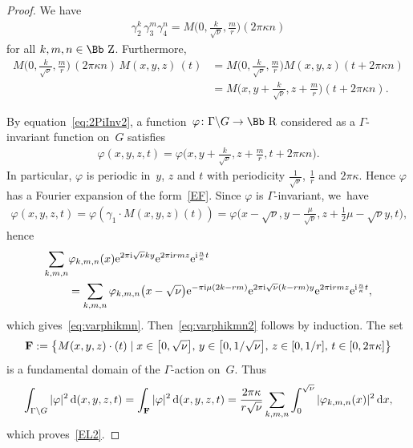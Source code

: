 \documentclass[pdftex]{sigma}
\newcommand\RR{{\mbox{\Bb R}}}
\newcommand\ZZ{{\mbox{\Bb Z}}}
\newcommand\bF{\textbf{{\rm \textbf{F}}}}
\newcommand\ph{\varphi}
\numberwithin{equation}{section}
\begin{document}
\begin{proof}
We have
\begin{gather*}
\gamma_2^{k} \,\gamma_3^{m}\gamma_4^{n} =M\bigg(0,\frac{k}{\sqrt\nu},\frac{m}{r}\bigg)(2\pi \kappa n)
\end{gather*}
for all $k,m,n\in\ZZ$.
Furthermore,
\begin{align}
M\bigg(0,\frac{k}{\sqrt\nu},\frac{m}{r}\bigg)\,(2\pi \kappa n)\, M(x,y,z)\,(t)
&=M\bigg(0,\frac{k}{\sqrt\nu},\frac{m}{r}\bigg)M(x,y,z)(t+2\pi\kappa n)\nonumber
\\
&=M\bigg(x,y+\frac{k}{\sqrt\nu},z+\frac{m}{r}\bigg)(t+2\pi \kappa n)\label{eq:2PiInv2}.
\end{align}

By equation~\eqref{eq:2PiInv2}, a function~$\varphi\colon \Gamma\backslash G\rightarrow\RR$ considered as a $\Gamma$-invariant function on~$G$ satisfies
\begin{gather*}
\varphi(x,y,z,t)=\varphi\bigg(x,y+\frac{k}{\sqrt\nu},z+\frac{m}r,t+2\pi \kappa n\bigg).
\end{gather*}
In particular, $\varphi$ is periodic in~$y$, $z$ and $t$ with periodicity $\frac{1}{\sqrt\nu}$, $\frac{1}{r}$ and $2\pi\kappa$.
Hence $\varphi$ has a Fourier expansion of the form~\eqref{EF}.
Since $\varphi$ is $\Gamma$-invariant, we~have
\begin{gather*}
\ph(x,y,z,t)=\ph(\gamma_1\cdot M(x,y,z)(t))=\ph\bigg(x-\sqrt\nu,y-\frac\mu{\sqrt\nu}, z+\frac12\mu-\sqrt\nu y,t\bigg),
\end{gather*}
hence
\begin{align*}
\sum_{k,m,n}&\varphi_{k,m,n}(x){\rm e}^{2\pi {\rm i}\sqrt\nu ky}{\rm e}^{2\pi {\rm i}rmz}{\rm e}^{{\rm i} \frac n \kappa t}\\
&=\sum_{k,m,n}\varphi_{k,m,n}\big(x-\sqrt\nu\big){\rm e}^{-\pi {\rm i}\mu (2k-rm)}{\rm e}^{2\pi {\rm i}\sqrt\nu (k-rm)y} {\rm e}^{2\pi {\rm i}rmz} {\rm e}^{{\rm i} \frac n\kappa t},
\end{align*}
which gives~\eqref{eq:varphikmn}. Then~\eqref{eq:varphikmn2} follows by induction.
The set
\begin{gather*}
\bF:=\big\{M(x,y,z)\cdot(t) \mid x\in \big[0,\sqrt\nu\big],\, y\in\big[0,1/\sqrt\nu\big],\, z\in[0,1/r],\, t\in[0,2\pi\kappa]\big\}
\end{gather*}
is a fundamental domain of the $\Gamma$-action on~$G$. Thus
\begin{gather*}
\int_{\Gamma\backslash G} |\varphi|^2 \,{\rm d}(x,y,z,t) =\int_{\bF} |\varphi|^2 \,{\rm d}(x,y,z,t)=\frac{2\pi \kappa}{r\sqrt\nu}\sum_{k,m,n}\int_0^{\sqrt\nu}|\varphi_{k,m,n}(x)|^2\,{\rm d}x,
\end{gather*}
which proves~\eqref{EL2}.
\end{proof}
\end{document}
